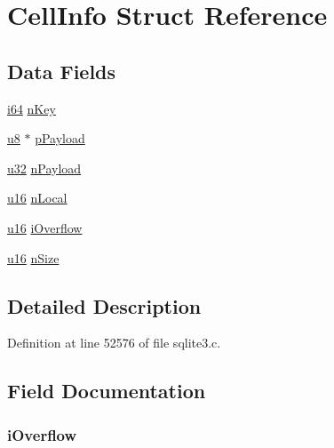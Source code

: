 \hypertarget{struct_cell_info}{}\section{Cell\+Info Struct Reference}
\label{struct_cell_info}
\subsection*{Data Fields}
\begin{DoxyCompactItemize}
\item 
\hyperlink{sqlite3_8c_a2a0f0f4ae7001eb54351f77ea1cdbcfd}{i64} \hyperlink{struct_cell_info_a528c39e09f68386edd6e2fbb64784561}{n\+Key}
\item 
\hyperlink{sqlite3_8c_a74a0f6424ae628af25f23f0a35f6ead3}{u8} $\ast$ \hyperlink{struct_cell_info_afb970a8132e75b04aa475245ca10bee4}{p\+Payload}
\item 
\hyperlink{sqlite3_8c_a03ad5adfaeb9b7640dde78a0cc390319}{u32} \hyperlink{struct_cell_info_a18261f92955ad0d6d9c5a3a7ad5111b0}{n\+Payload}
\item 
\hyperlink{sqlite3_8c_a20f2299e322dcbde37cb07b16910b843}{u16} \hyperlink{struct_cell_info_adfcb522da4fa98a0a28b8bae807881fc}{n\+Local}
\item 
\hyperlink{sqlite3_8c_a20f2299e322dcbde37cb07b16910b843}{u16} \hyperlink{struct_cell_info_a044b244acf3b9ac9f3d9a4314716ce58}{i\+Overflow}
\item 
\hyperlink{sqlite3_8c_a20f2299e322dcbde37cb07b16910b843}{u16} \hyperlink{struct_cell_info_a83ef3090f08d05f737462f2f36eddb97}{n\+Size}
\end{DoxyCompactItemize}


\subsection{Detailed Description}


Definition at line 52576 of file sqlite3.\+c.



\subsection{Field Documentation}
\hypertarget{struct_cell_info_a044b244acf3b9ac9f3d9a4314716ce58}{}
\subsubsection[{i\+Overflow}]{ i\+Overflow}\label{struct_cell_info_a044b244acf3b9ac9f3d9a4314716ce58}


